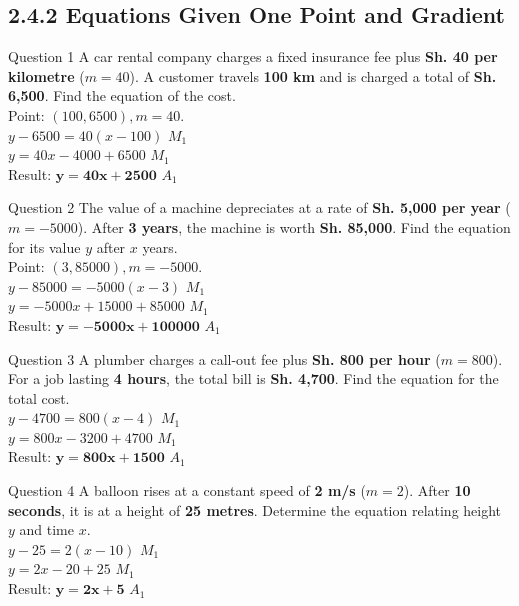 \documentclass[12pt, a4paper, oneside]{article}
\begin{document}
\newpage
\subsection*{2.4.2 Equations Given One Point and Gradient}

\begin{solvingbox}{Question 1}
A car rental company charges a fixed insurance fee plus \textbf{Sh. 40 per kilometre} ($m=40$). A customer travels \textbf{100 km} and is charged a total of \textbf{Sh. 6,500}. Find the equation of the cost. \\
Point: $(100, 6500), m = 40$. \\
$y - 6500 = 40(x - 100)$ \hfill $M_1$ \\
$y = 40x - 4000 + 6500$ \hfill $M_1$ \\
Result: $\mathbf{y = 40x + 2500}$ \hfill $A_1$
\end{solvingbox}

\begin{solvingbox}{Question 2}
The value of a machine depreciates at a rate of \textbf{Sh. 5,000 per year} ($m=-5000$). After \textbf{3 years}, the machine is worth \textbf{Sh. 85,000}. Find the equation for its value $y$ after $x$ years. \\
Point: $(3, 85000), m = -5000$. \\
$y - 85000 = -5000(x - 3)$ \hfill $M_1$ \\
$y = -5000x + 15000 + 85000$ \hfill $M_1$ \\
Result: $\mathbf{y = -5000x + 100000}$ \hfill $A_1$
\end{solvingbox}

\begin{solvingbox}{Question 3}
A plumber charges a call-out fee plus \textbf{Sh. 800 per hour} ($m=800$). For a job lasting \textbf{4 hours}, the total bill is \textbf{Sh. 4,700}. Find the equation for the total cost. \\
$y - 4700 = 800(x - 4)$ \hfill $M_1$ \\
$y = 800x - 3200 + 4700$ \hfill $M_1$ \\
Result: $\mathbf{y = 800x + 1500}$ \hfill $A_1$
\end{solvingbox}

\begin{solvingbox}{Question 4}
A balloon rises at a constant speed of \textbf{2 m/s} ($m=2$). After \textbf{10 seconds}, it is at a height of \textbf{25 metres}. Determine the equation relating height $y$ and time $x$. \\
$y - 25 = 2(x - 10)$ \hfill $M_1$ \\
$y = 2x - 20 + 25$ \hfill $M_1$ \\
Result: $\mathbf{y = 2x + 5}$ \hfill $A_1$
\end{solvingbox}
\end{document}
